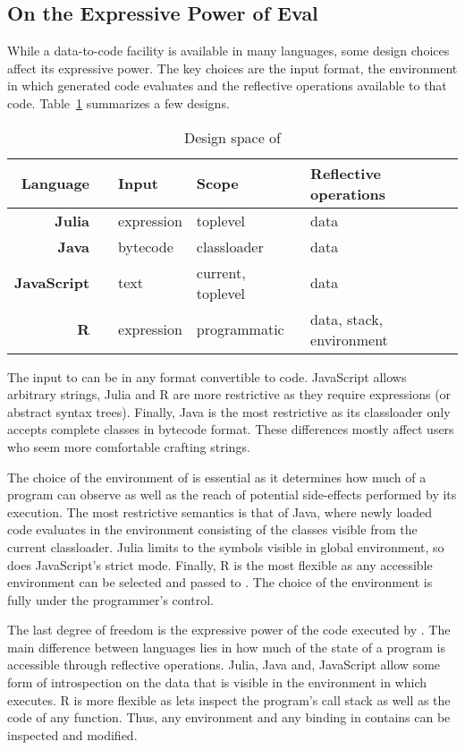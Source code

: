 \documentclass[screen,acmsmall]{acmart}%
\begin{document}
\subsection{On the Expressive Power of Eval}

While a data-to-code facility is available in many languages, some design
choices affect its expressive power. The key choices are the input format, the
environment in which generated code evaluates and the reflective operations
available to that code. Table~\ref{comp} summarizes a few designs.

\begin{table}[!h]\center\small\begin{tabular}{r@{~}llll}\toprule
\tiny\sc Language&&\sc\tiny Input&\sc\tiny Scope&\tiny\sc Reflective operations\\\midrule
\bf Julia&\cite{julia}     & expression& toplevel         & data\\
\bf Java&\cite{cl}  & bytecode  & classloader       & data\\
\bf JavaScript&\cite{ecoop11}& text      & current, toplevel& data\\
\bf R&\cite{R96}  & expression& programmatic      & data, stack, environment\\\bottomrule
\end{tabular}\caption{Design space of \eval}\label{comp}
\end{table}

The input to \eval can be in any format convertible to code. JavaScript allows
arbitrary strings, Julia and R are more restrictive as they require expressions
(or abstract syntax trees). Finally, Java is the most restrictive as its
classloader only accepts complete classes in bytecode format. These differences
mostly affect users who seem more comfortable crafting strings.

The choice of the environment of \eval is essential as it determines how much of
a program \eval can observe as well as the reach of potential side-effects
performed by its execution. The most restrictive semantics is that of Java,
where newly loaded code evaluates in the environment consisting of the classes
visible from the current classloader. Julia limits \eval to the symbols visible
in global environment, so does JavaScript's strict mode. Finally, R is the most
flexible as any accessible environment can be selected and passed to \eval. The
choice of the environment is fully under the programmer's control.

The last degree of freedom is the expressive power of the code executed by
\eval. The main difference between languages lies in how much of the state of a
program is accessible through reflective operations. Julia, Java and, JavaScript
allow some form of introspection on the data that is visible in the environment
in which \eval executes. R is more flexible as lets \eval inspect the program's
call stack as well as the code of any function. Thus, any environment and any
binding in contains can be inspected and modified.
\end{document}
